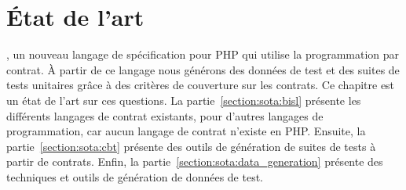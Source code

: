 \chapter{État de l'art}
\label{chapter:state}

\mminitoc

, un nouveau langage de spécification pour PHP qui utilise la
programmation par contrat. À partir de ce langage nous générons des données de
test et des suites de tests unitaires grâce à des critères de couverture sur les
contrats. Ce chapitre est un état de l'art sur ces questions.  La
partie~\ref{section:sota:bisl} présente les différents langages de contrat
existants, pour d'autres langages de programmation, car aucun langage de contrat
n'existe en PHP. Ensuite, la partie~\ref{section:sota:cbt} présente des outils
de génération de suites de tests à partir de contrats. Enfin, la
partie~\ref{section:sota:data_generation} présente des techniques et outils de
génération de données de test.

